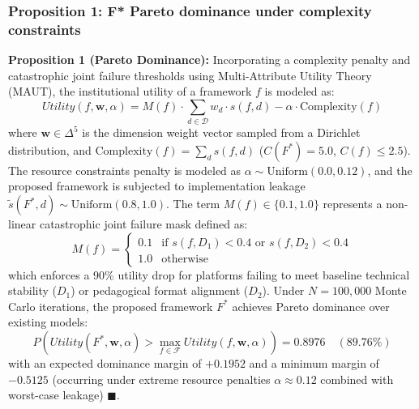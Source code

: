 \documentclass[11pt,a4paper]{article}
\begin{document}
\subsubsection{Proposition 1: F* Pareto dominance under complexity constraints}
\textbf{Proposition 1 (Pareto Dominance):} Incorporating a complexity penalty and catastrophic joint failure thresholds using Multi-Attribute Utility Theory (MAUT), the institutional utility of a framework $f$ is modeled as:
\begin{equation}
  Utility(f, \mathbf{w}, \alpha) = M(f) \cdot \sum_{d \in \mathcal{D}} w_d \cdot s(f,d) - \alpha \cdot \text{Complexity}(f)
\end{equation}
where $\mathbf{w} \in \Delta^5$ is the dimension weight vector sampled from a Dirichlet distribution, and $\text{Complexity}(f) = \sum_d s(f,d)$ ($C(F^*) = 5.0$, $C(f) \le 2.5$). The resource constraints penalty is modeled as $\alpha \sim \text{Uniform}(0.0, 0.12)$, and the proposed framework is subjected to implementation leakage $\tilde{s}(F^*, d) \sim \text{Uniform}(0.8, 1.0)$. The term $M(f) \in \{0.1, 1.0\}$ represents a non-linear catastrophic joint failure mask defined as:
\begin{equation}
  M(f) = \begin{cases} 0.1 & \text{if } s(f, D_1) < 0.4 \text{ or } s(f, D_2) < 0.4 \\ 1.0 & \text{otherwise} \end{cases}
\end{equation}
which enforces a 90\% utility drop for platforms failing to meet baseline technical stability ($D_1$) or pedagogical format alignment ($D_2$).
Under $N = 100,000$ Monte Carlo iterations, the proposed framework $F^*$ achieves Pareto dominance over existing models:
\begin{equation}
  P\left(Utility(F^*, \mathbf{w}, \alpha) > \max_{f \in \mathcal{F}} Utility(f, \mathbf{w}, \alpha)\right) = 0.8976 \quad (89.76\%)
\end{equation}
with an expected dominance margin of $+0.1952$ and a minimum margin of $-0.5125$ (occurring under extreme resource penalties $\alpha \approx 0.12$ combined with worst-case leakage) $\blacksquare$.
\end{document}
